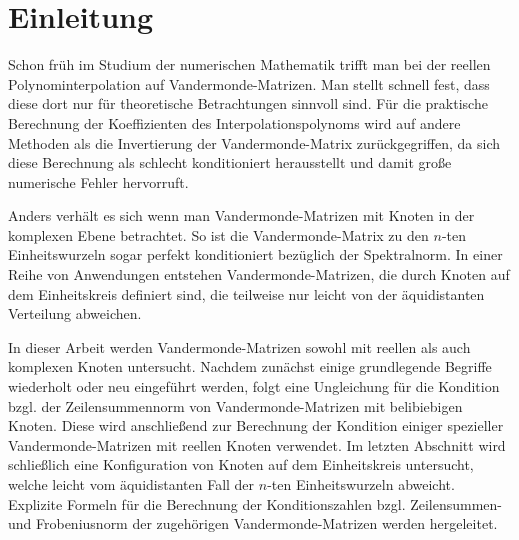 \chapter{Einleitung}

Schon früh im Studium der numerischen Mathematik trifft man bei der reellen
Polynominterpolation auf Vandermonde-Matrizen.  Man stellt schnell fest, dass
diese dort nur für theoretische Betrachtungen sinnvoll sind.  Für die
praktische Berechnung der Koeffizienten des Interpolationspolynoms wird auf
andere Methoden als die Invertierung der Vandermonde-Matrix zurückgegriffen, da
sich diese Berechnung als schlecht konditioniert herausstellt und damit große
numerische Fehler hervorruft.

Anders verhält es sich wenn man Vandermonde-Matrizen mit Knoten in der
komplexen Ebene betrachtet.  So ist die Vandermonde-Matrix zu den $n$-ten
Einheitswurzeln sogar perfekt konditioniert bezüglich der Spektralnorm.
In einer Reihe von Anwendungen entstehen Vandermonde-Matrizen, die durch Knoten
auf dem Einheitskreis definiert sind, die teilweise nur leicht von der
äquidistanten Verteilung abweichen.

In dieser Arbeit werden Vandermonde-Matrizen sowohl mit reellen als auch
komplexen Knoten untersucht.
Nachdem zunächst einige grundlegende Begriffe wiederholt oder neu eingeführt
werden, folgt eine Ungleichung für die Kondition bzgl. der Zeilensummennorm von
Vandermonde-Matrizen mit belibiebigen Knoten.
Diese wird anschließend zur Berechnung der Kondition einiger spezieller
Vandermonde-Matrizen mit reellen Knoten verwendet.
Im letzten Abschnitt wird schließlich eine Konfiguration von Knoten auf dem
Einheitskreis untersucht, welche leicht vom äquidistanten Fall der $n$-ten
Einheitswurzeln abweicht.
Explizite Formeln für die Berechnung der Konditionszahlen bzgl. Zeilensummen-
und Frobeniusnorm der zugehörigen Vandermonde-Matrizen werden hergeleitet.
